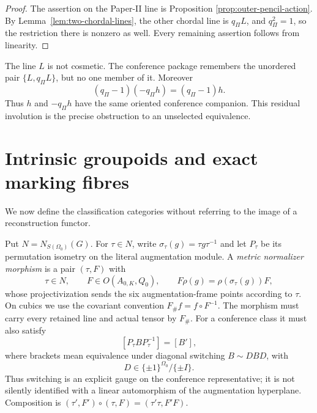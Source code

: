 \documentclass[11pt]{article}
\theoremstyle{definition}
\theoremstyle{remark}
\begin{document}
\begin{proof}
The assertion on the Paper-II line is Proposition
\ref{prop:outer-pencil-action}.  By Lemma~\ref{lem:two-chordal-lines}, the
other chordal line is \(q_\Pi L\), and
\(q_\Pi^2=1\), so the restriction there is nonzero as well.  Every remaining
assertion follows from linearity.
\end{proof}

The line \(L\) is not cosmetic.  The conference package remembers the
unordered pair \(\{L,q_\Pi L\}\), but no one member of it.  Moreover
\[
       (q_\Pi-1)(-q_\Pi h)=(q_\Pi-1)h.
\]
Thus \(h\) and \(-q_\Pi h\) have the same oriented conference companion.
This residual involution is the precise obstruction to an unselected
equivalence.

\section{Intrinsic groupoids and exact marking fibres}
\label{sec:groupoids}

We now define the classification categories without referring to the image
of a reconstruction functor.

Put \(N=N_{S(\Omega_0)}(G)\).  For \(\tau\in N\), write
\(\sigma_\tau(g)=\tau g\tau^{-1}\) and let \(P_\tau\) be its permutation
isometry on the literal augmentation module.  A \emph{metric normalizer
morphism} is a pair \((\tau,F)\) with
\[
 \tau\in N,\qquad F\in O(A_{0,K},Q_0),\qquad
 F\rho(g)=\rho(\sigma_\tau(g))F,
\]
whose projectivization sends the six augmentation-frame points according to
\(\tau\).  On cubics we use the covariant convention
\(F_\#f=f\circ F^{-1}\).  The morphism must carry every retained line and
actual tensor by \(F_\#\).  For a conference class it must also satisfy
\[
                    [P_\tau BP_\tau^{-1}]=[B'],
\]
where brackets mean equivalence under diagonal switching
\(B\sim DBD\), with
\[
                  D\in\{\pm1\}^{\Omega_0}/\{\pm I\}.
\]
Thus switching
is an explicit gauge on the conference representative; it is not silently
identified with a linear automorphism of the augmentation hyperplane.
Composition is \((\tau',F')\circ(\tau,F)=(\tau'\tau,F'F)\).
\end{document}
